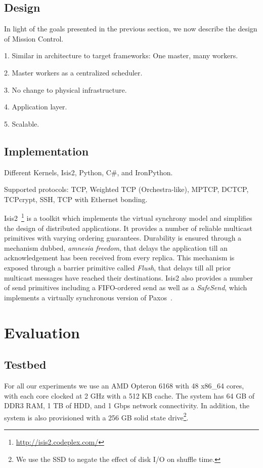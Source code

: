 \documentclass[a4paper,12pt,twoside,openright]{report}
\begin{document}
\section{Design}
In light of the goals presented in the previous section, we now describe the
design of Mission Control.

1. Similar in architecture to target frameworks: One master, many workers.

2. Master workers as a centralized scheduler.

3. No change to physical infrastructure.

4. Application layer.

5. Scalable.

\section{Implementation}
Different Kernels, Isis2, Python, C\#, and IronPython.

Supported protocols: TCP, Weighted TCP (Orchestra-like), MPTCP, DCTCP, TCPcrypt,
SSH, TCP with Ethernet bonding.

Isis2~\cite{Birman:2012:OCW}\footnote{\url{http://isis2.codeplex.com/}} is a
toolkit which implements the virtual synchrony model and simplifies the design
of distributed applications. It provides a number of reliable multicast
primitives with varying ordering guarantees. Durability is ensured through a
mechanism dubbed, \emph{amnesia freedom}, that delays the application till an
acknowledgement has been received from every replica. This mechanism is exposed
through a barrier primitive called \emph{Flush}, that delays till all prior
multicast messages have reached their destinations. Isis2 also provides a number
of send primitives including a FIFO-ordered send as well as a \emph{SafeSend},
which implements a virtually synchronous version of
Paxos~\cite{Lamport:1998:PP}.

\chapter{Evaluation}\label{chapter:evaluation}

\section{Testbed}
For all our experiments we use an AMD Opteron 6168 with 48 x86\_64 cores, with
each core clocked at 2 GHz with a 512 KB cache. The system has 64 GB of DDR3
RAM, 1 TB of HDD, and 1 Gbps network connectivity. In addition, the system is
also provisioned with a 256 GB solid state drive\footnote{We use the SSD to
negate the effect of disk I/O on shuffle time.}.
\end{document}
